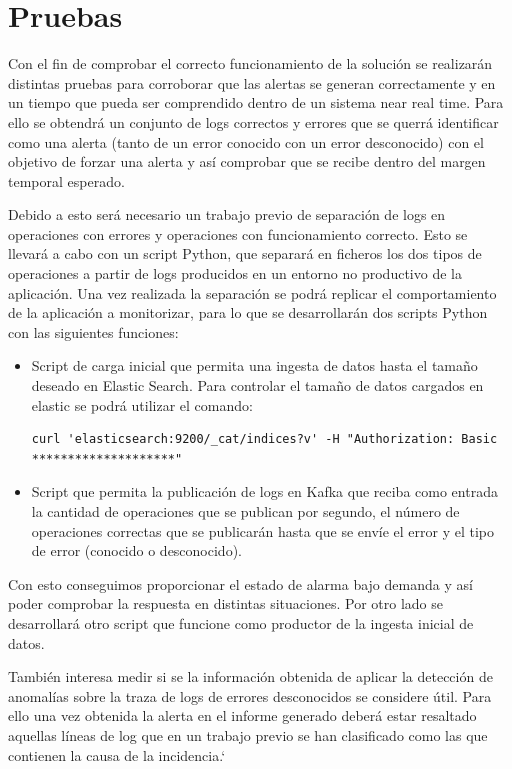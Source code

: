 \chapter{Pruebas}

Con el fin de comprobar el correcto funcionamiento de la solución se realizarán distintas pruebas para corroborar que las alertas se generan correctamente y en un tiempo que pueda ser comprendido dentro de un sistema near real time. Para ello se obtendrá un conjunto de logs correctos y errores que se querrá identificar como una alerta (tanto de un error conocido con un error desconocido) con el objetivo de forzar una alerta y así comprobar que se recibe dentro del margen temporal esperado.

Debido a esto será necesario un trabajo previo de separación de logs en operaciones con errores y operaciones con funcionamiento correcto. Esto se llevará a cabo con un script Python, que separará en ficheros los dos tipos de operaciones a partir de logs producidos en un entorno no productivo de la aplicación. Una vez realizada la separación se podrá replicar el comportamiento de la aplicación a monitorizar, para lo que se desarrollarán dos scripts Python con las siguientes funciones:

\begin{itemize}
\item Script de carga inicial que permita una ingesta de datos hasta el tamaño deseado en Elastic Search. Para controlar el tamaño de datos cargados en elastic se podrá utilizar el comando:

\begin{verbatim}
curl 'elasticsearch:9200/_cat/indices?v' -H "Authorization: Basic ********************"
\end{verbatim}

\item Script que permita la publicación de logs en Kafka que reciba como entrada la cantidad de operaciones que se publican por segundo, el número de operaciones correctas que se publicarán hasta que se envíe el error y el tipo de error (conocido o desconocido).
\end{itemize}

Con esto conseguimos proporcionar el estado de alarma bajo demanda y así poder comprobar la respuesta en distintas situaciones. Por otro lado se desarrollará otro script que funcione como productor de la ingesta inicial de datos.

También interesa medir si se la información obtenida de aplicar la detección de anomalías sobre la traza de logs de errores desconocidos se considere útil. Para ello una vez obtenida la alerta en el informe generado deberá estar resaltado aquellas líneas de log que en un trabajo previo se han clasificado como las que contienen la causa de la incidencia.`


